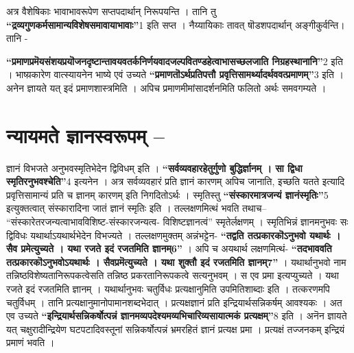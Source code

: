 {अत्र वैशेषिकाः भावाभावरूपेण सप्तपदार्थान् निरूपयन्ति । तानि तु \textbf{“द्रव्यगुणकर्मसामान्यविशेषसमावायाभावाः”}1 इति सप्त । नैय्यायिकाः तावत् षॊडशपदार्थान् अङ्गीकुर्वन्ति। तानि -

\textbf{“प्रमाणप्रमॆयसंशयप्रयॊजनदृष्टान्तावयवतर्कनिर्णयवादजल्पवितण्डहेत्वाभासच्छलजाति निग्रहस्थानानि”}2 इति । भाष्य़कारेण वात्स्यायनेन भाष्ये एवं उच्यते \textbf{“प्रमाणतॊऽर्थप्रतिपत्तौ प्रवृत्तिसामर्थ्यादर्थववत्प्रमाणम्”}3 इति । अनेन ज्ञायते यत् इदं प्रमाणशास्त्रमिति । अपिच प्रमाणमीमांसादर्शनमिति फलितो अर्थः समवगम्यते ।

\section*{न्यायमते ज्ञानस्वरूपम् –}

ज्ञानं विभजते अनुभवस्मृतिभेदेन द्विविधम् इति । \textbf{“सर्वव्यवहारहेतुर्गुणो बुद्धिर्ज्ञानम् । सा द्विधा स्मृतिरनुभवश्चेति”}4 इत्यनेन । अत्र सर्वव्यवहारं प्रति ज्ञानं कारणम् अपिच जानाति, इच्छति यतते इत्यादि प्रवृत्तिसामान्यं प्रति च ज्ञानम् कारणम् इति निगदितोऽर्थः । स्मृतिस्तु \textbf{“संस्कारमात्रजन्यं ज्ञानंस्मृतिः”}5 इत्युक्तत्वात् संस्कारादिना जातं ज्ञानं स्मृतिः इति । तल्लक्षणमित्थं भवति तथाच– “संस्कारेतरजन्यत्वाभावविशिष्ट-संस्कारजन्यत्व- विशिष्टज्ञानत्वं” स्मृतेर्लक्षणम् । स्मृतिभिन्नं ज्ञानमनुभवः सः द्विविधः यथार्थाऽयथार्थभेदेन विभज्यते । तल्लक्षणमुक्तम् अन्नंभट्टेन- \textbf{“तद्वति तत्प्रकारकॊऽनुभवो यथार्थः । सैव प्रमेत्युच्यते । यथा रजते इदं रजतमिति ज्ञानम्6”} । अपि च अयथार्थ लक्षणमित्थं- \textbf{“तदभाववति तत्प्रकारकॊऽनुभवोऽयथार्थः । सैवप्रमॆत्युच्यते । यथा शुक्तौ इदं रजतमिति ज्ञानम्7”} । यथार्थानुभवो नाम तन्निष्ठविशेष्यतानिरूपकत्वेसति तन्निष्ठ प्रकरतानिरूपकत्वे सत्यनुभवम् । स एव प्रमा इत्यप्युच्यते । यथा रजते इदं रजतमिति ज्ञानम् । यथार्थानुभवः चतुर्विधः प्रत्यक्षानुमिति उपमितिशाब्दाः इति । तत्करणमपि चतुर्विधम् । तानि प्रत्यक्षानुमानोपामानशब्दभेदात् । प्रत्यक्षज्ञानं प्रति इन्द्रियार्थसन्निकर्षम् आवश्यकः । अत एव उच्यते \textbf{“इन्द्रियार्थसन्निकर्षोत्पन्नं ज्ञानमव्यपदेश्यमव्यभिचारिव्यसायात्मकं प्रत्यक्षम्”}8 इति । अनॆन ज्ञायते यत् चक्षुरादीन्द्रियेण घटपटादिवस्तूनां सन्निकर्षोत्पन्नं भ्रमरहितं ज्ञानं प्रत्यक्ष प्रमा । प्रत्यक्षं तज्जनकम् इन्द्रियं प्रमाणं भवति ।

}
